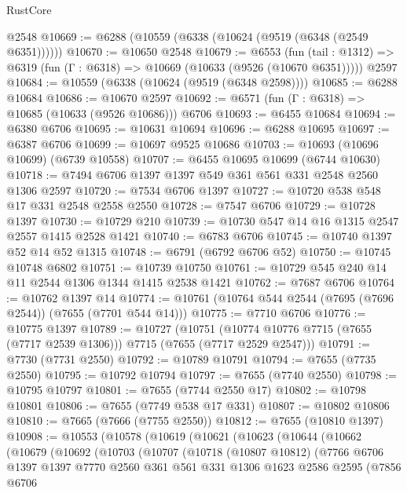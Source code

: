 \begin{lexlean}{RustCore}
\begin{coremodule}
    @2548
@10669 := @6288 (@10559 (@6338 (@10624 (@9519 (@6348 (@2549 @6351))))))
@10670 := @10650 @2548
@10679 := @6553
    (fun (tail : @1312) => @6319 (fun (Γ : @6318) => @10669 (@10633 (@9526 (@10670 @6351)))))
    @2597
@10684 := @10559 (@6338 (@10624 (@9519 (@6348 @2598))))
@10685 := @6288 @10684
@10686 := @10670 @2597
@10692 := @6571 (fun (Γ : @6318) => @10685 (@10633 (@9526 @10686))) @6706
@10693 := @6455 @10684
@10694 := @6380 @6706
@10695 := @10631 @10694
@10696 := @6288 @10695
@10697 := @6387 @6706
@10699 := @10697 @9525 @10686
@10703 := @10693 (@10696 @10699) (@6739 @10558)
@10707 := @6455 @10695 @10699 (@6744 @10630)
@10718 := @7494 @6706 @1397 @1397 @549 @361 @561 @331 @2548 @2560 @1306 @2597
@10720 := @7534 @6706 @1397
@10727 := @10720 @538 @548 @17 @331 @2548 @2558 @2550
@10728 := @7547 @6706
@10729 := @10728 @1397
@10730 := @10729 @210
@10739 := @10730 @547 @14 @16 @1315 @2547 @2557 @1415 @2528 @1421
@10740 := @6783 @6706
@10745 := @10740 @1397 @52 @14 @52 @1315
@10748 := @6791 (@6792 @6706 @52)
@10750 := @10745 @10748 @6802
@10751 := @10739 @10750
@10761 := @10729 @545 @240 @14 @11 @2544 @1306 @1344 @1415 @2538 @1421
@10762 := @7687 @6706
@10764 := @10762 @1397 @14
@10774 := @10761 (@10764 @544 @2544 (@7695 (@7696 @2544)) (@7655 (@7701 @544 @14)))
@10775 := @7710 @6706
@10776 := @10775 @1397
@10789 := @10727
    (@10751 (@10774 @10776 @7715 (@7655 (@7717 @2539 @1306))) @7715 (@7655 (@7717 @2529 @2547)))
@10791 := @7730 (@7731 @2550)
@10792 := @10789 @10791
@10794 := @7655 (@7735 @2550)
@10795 := @10792 @10794
@10797 := @7655 (@7740 @2550)
@10798 := @10795 @10797
@10801 := @7655 (@7744 @2550 @17)
@10802 := @10798 @10801
@10806 := @7655 (@7749 @538 @17 @331)
@10807 := @10802 @10806
@10810 := @7665 (@7666 (@7755 @2550))
@10812 := @7655 (@10810 @1397)
@10908 := @10553
    (@10578
      (@10619
        (@10621
          (@10623
            (@10644
              (@10662
                (@10679
                  (@10692
                    (@10703
                      (@10707
                        (@10718
                          (@10807 @10812)
                          (@7766
                            @6706
                            @1397
                            @1397
                            @7770
                            @2560
                            @361
                            @561
                            @331
                            @1306
                            @1623
                            @2586
                            @2595
                            (@7856
                              @6706

\end{coremodule}
\end{lexlean}
